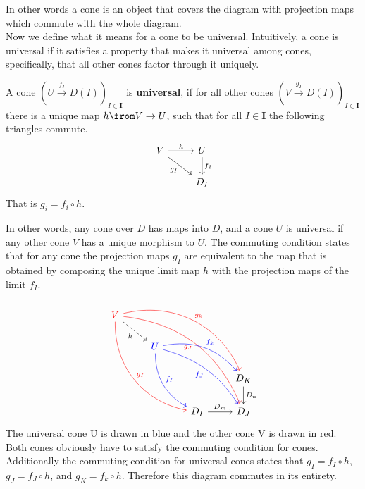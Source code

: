 In other words a cone is an object that covers the diagram with projection maps
which commute with the whole diagram.\\
Now we define what it means for a cone to be universal. Intuitively,
a cone is universal if it satisfies a property that makes it universal among cones,
specifically, that all other cones factor through it uniquely.

\begin{definition}
  A cone $(U \overset{f_I}{\to} D(I))_{I\in \bm{I}}$ is \textbf{universal}, if
  for all other cones $(V \overset{g_I}{\to} D(I))_{I\in \bm{I}}$ there is a unique
  map $h \from V \to U$, such that for all $I \in \bm{I}$
  the following triangles commute.
  \[
    \begin{tikzcd}
      V \arrow[dr, swap, "g_I"] \arrow{r}{h} & U \arrow{d}{f_I} \\
      & D_I
    \end{tikzcd}
  \]
  That is $g_i = f_i \circ h$.
\end{definition}

In other words, any cone over $D$ has maps into $D$, and a cone $U$ is universal if
any other cone $V$ has a unique morphism to $U$.
The commuting condition states that for any cone
the projection maps $g_I$ are equivalent
to the map that is obtained by composing the unique limit map $h$ with the
projection maps of the limit $f_I$.

\begin{example}
    \[
    \begin{tikzcd}
      {\color{red}V}
      \arrow[bend right=40,color=red]{dddrr}{g_I}
      \arrow[bend left=40, color=red]{ddrrr}{g_k}
      \arrow[bend left=30, color=red, swap]{dddrrr}{g_J}
      \arrow[dashed,swap]{dr}{h}
      & & & \\
      & {\color{blue}U}
      \arrow[bend right=30,color=blue]{ddr}{f_I}
      \arrow[bend left=30, color=blue]{drr}{f_k}
      \arrow[bend left=20, color=blue, swap]{ddrr}{f_J}&   &\\
      & & & D_K \arrow{d}{D_n} \\
      & & D_I \arrow{r}{D_m} & D_J
    \end{tikzcd}
  \]
  The universal cone {\color{blue}U}
  is drawn in blue and the other cone {\color{red}V} is drawn in red.
  Both cones obviously have to satisfy the commuting condition for cones.
  Additionally the commuting condition for universal cones states that
  $g_I = f_I \circ h$, $g_J = f_J \circ h$, and $g_K = f_k \circ h$.
  Therefore this diagram commutes in its entirety.
\end{example}

